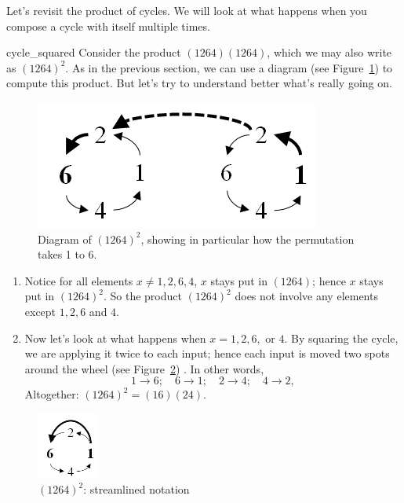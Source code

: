 Let's revisit the product of cycles.  We will look at what happens when you compose a cycle with itself multiple times.

\begin{example}{cycle_squared}
Consider the product $(1264)(1264)$, which we may also write as $(1264)^2$. As in the previous section, we can use a diagram (see Figure~\ref{fig:perm_square}) to compute this product. But let's try to understand better what's really going on.

\begin{figure}[ht]
\begin{center}
\includegraphics[width=2.in]{images/perm_square.png}
\caption{Diagram of $(1264)^2$, showing in particular how the permutation takes 1 to 6.}\label{fig:perm_square}
\end{center}
\end{figure}

\begin{enumerate}[(1)]
\item
Notice for all elements $x \neq 1, 2, 6, 4$, $x$ stays put in $(1264)$; hence $x$ stays put in $(1264)^2$.  So the product $(1264)^2$ does not involve any elements except $1, 2, 6$ and $4$.
\item
Now let's look at what happens when $x = 1, 2, 6,$ or $4$.   By squaring the cycle, we are applying it twice to each input; hence each input is moved two spots around the wheel (see Figure~\ref{fig:perm_square2}) .  In other words,  
\[
1 \to 6;  \quad 6 \to 1; \quad 2 \to 4; \quad 4 \to 2,
\]
Altogether: $(1264)^2 = (16)(24)$.
\end{enumerate}

\begin{figure}[ht]
\begin{center}
\includegraphics[width=0.8in]{images/perm_square2.png}
\caption{$(1264)^2$: streamlined notation}\label{fig:perm_square2}
\end{center}
\end{figure}


\end{example}

